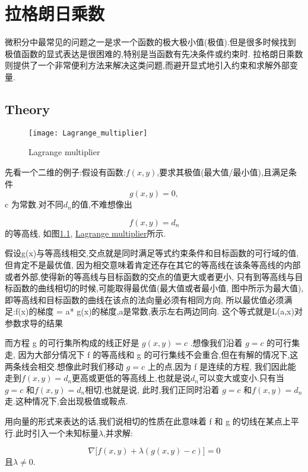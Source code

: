 \chapter{拉格朗日乘数}
微积分中最常见的问题之一是求一个函数的极大极小值(极值).但是很多时候找到极值函数的显式表达是很困难的,特别是当函数有先决条件或约束时.
拉格朗日乘数则提供了一个非常便利方法来解决这类问题,而避开显式地引入约束和求解外部变量.

\section{Theory}
\begin{figure}[htbp]
  \centering
  \texttt{[image: Lagrange\_multiplier]}\\
  \caption{Lagrange multiplier}\label{fig.Lagrange.multiplier}
\end{figure}

先看一个二维的例子:假设有函数:$f(x, y)$,要求其极值(最大值/最小值),且满足条件
$$ g\left( x,y \right) = 0, $$
c 为常数.对不同$d_n$的值,不难想像出

$$ f \left( x, y \right)=d_n $$
的等高线, 如图\ref{fig.Lagrange.multiplier},
\href{http://upload.wikimedia.org/wikipedia/commons/thumb/f/fa/Lagrange\_multiplier.png/300px-Lagrange\_multiplier.png}{Lagrange multiplier}所示.

假设g(x)与等高线相交,交点就是同时满足等式约束条件和目标函数的可行域的值,但肯定不是最优值,
因为相交意味着肯定还存在其它的等高线在该条等高线的内部或者外部,使得新的等高线与目标函数的交点的值更大或者更小,
只有到等高线与目标函数的曲线相切的时候,可能取得最优值(最大值或者最小值, 图中所示为最大值),
即等高线和目标函数的曲线在该点的法向量必须有相同方向,
所以最优值必须满足:f(x)的梯度 = a* g(x)的梯度,a是常数,表示左右两边同向.
这个等式就是L(a,x)对参数求导的结果

而方程 g 的可行集所构成的线正好是 $g ( x, y ) = c$ .想像我们沿着 $g = c$ 的可行集走,
因为大部分情况下 f 的等高线和 g 的可行集线不会重合,但在有解的情况下,这两条线会相交.想像此时我们移动 $g = c$ 上的点,因为 f 是连续的方程,
我们因此能走到$f \left( x, y \right)=d_n$更高或更低的等高线上,也就是说$d_n$可以变大或变小.只有当 $g = c$ 和$f \left( x, y \right)=d_n$相切,也就是说,
此时,我们正同时沿着 $g = c$ 和$f \left( x, y \right)=d_n$走.这种情况下,会出现极值或鞍点.

用向量的形式来表达的话,我们说相切的性质在此意味着 f 和 g 的切线在某点上平行.此时引入一个未知标量$\lambda$,并求解:

$$ \nabla \Big[f \left(x, y \right) + \lambda \left(g \left(x, y \right) - c \right) \Big] = 0 $$
且$\lambda \neq 0$.

